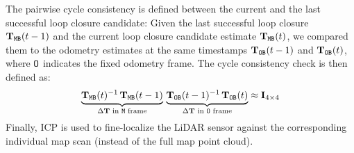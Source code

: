The pairwise cycle consistency is defined between the current and the last successful loop closure candidate: Given the last successful loop closure $\mathbf{T}_{\mathtt{M}\mathtt{B}}(t-1)$ and the current loop closure candidate estimate $\mathbf{T}_{\mathtt{M}\mathtt{B}}(t)$, we compared them to the odometry estimates at the same timestamps $\mathbf{T}_{\mathtt{O}\mathtt{B}}(t-1)$ and $\mathbf{T}_{\mathtt{O}\mathtt{B}}(t)$, where $\mathtt{O}$ indicates the fixed odometry frame. The cycle consistency check is then defined as:
\begin{equation}
  \label{eq:cycle-relocalization}
  \underbrace{\mathbf{T}_{\mathtt{M}\mathtt{B}}(t)^{-1}\, \mathbf{T}_{\mathtt{M}\mathtt{B}}(t-1)}_{\Delta\mathbf{T} \text{ in $\mathtt{M}$ frame}}  \, \underbrace{ \mathbf{T}_{\mathtt{O}\mathtt{B}}(t-1)^{-1}\,  \mathbf{T}_{\mathtt{O}\mathtt{B}}(t)}_{\Delta\mathbf{T} \text{ in $\mathtt{O}$ frame}} \approx \mathbf{I}_{4\times4}
\end{equation}
Finally, ICP is used to fine-localize the LiDAR sensor against the corresponding individual map scan (instead of the full map point cloud).












